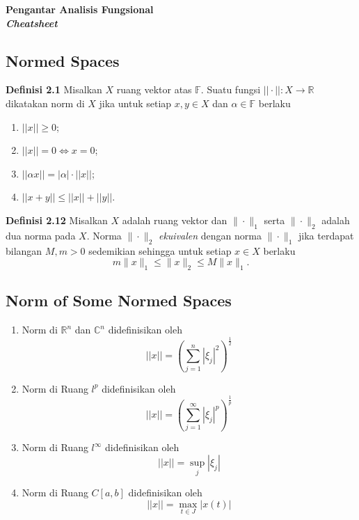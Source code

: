 \documentclass{article}
\newcommand{\F}{\mathbb{F}}
\newcommand{\R}{\mathbb{R}}
\newcommand{\C}{\mathbb{C}}
\begin{document}
\begin{center}
  {\LARGE\textbf{Pengantar Analisis Fungsional}}\\[0.5cm]
  {\large\textbf{\textit{Cheatsheet}}}
\end{center}
\vspace{0.5cm}

\begin{multicols}{2}
  \subsection*{Normed Spaces}
  \vspace{-1em}
  \textbf{Definisi 2.1} Misalkan $X$ ruang vektor atas $\F$. Suatu fungsi $||\cdot||:X\to \R$ dikatakan norm di $X$ jika untuk setiap $x,y\in X$ dan $\alpha\in\F$ berlaku
  \begin{enumerate}[label=(\roman*)]
    \item $||x||\geq0$;
    \item $||x||=0\iff x=0$;
    \item $||\alpha x||=|\alpha|\cdot||x||$;
    \item $||x+y||\leq||x||+||y||$.
  \end{enumerate}
  \textbf{Definisi 2.12} Misalkan \( X \) adalah ruang vektor dan \( \|\cdot\|_1 \) serta \( \|\cdot\|_2 \) adalah dua norma pada \( X \). Norma \( \|\cdot\|_2 \) \textit{ekuivalen} dengan norma \( \|\cdot\|_1 \) jika terdapat bilangan \( M, m > 0 \) sedemikian sehingga untuk setiap \( x \in X \) berlaku
  \[
    m\|x\|_1 \leq \|x\|_2 \leq M\|x\|_1.
  \]
  \subsection*{Norm of Some Normed Spaces}
  \begin{enumerate}
    \item Norm di $\R^n$ dan $\C^n$ didefinisikan oleh
          $$||x||=\left(\sum_{j=1}^n|\xi_j|^2\right)^\frac{1}{2}$$
    \item Norm di Ruang $l^p$ didefinisikan oleh
          $$||x||=\left(\sum_{j=1}^\infty|\xi_j|^p\right)^\frac{1}{p}$$
    \item Norm di Ruang $l^\infty$ didefinisikan oleh
          $$||x||=\sup_j|\xi_j|$$
    \item Norm di Ruang $C[a,b]$ didefinisikan oleh
          $$||x||=\max_{t\in J}|x(t)|$$
  \end{enumerate}

\end{multicols}
\end{document}
